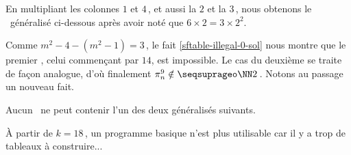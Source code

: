 En multipliant les colonnes $1$ et $4$\,, et aussi la $2$ et la $3$\,, nous obtenons le \sftab\ généralisé ci-dessous après avoir noté que $6 \times 2 = 3 \times 2^2$.

\begin{center}
\end{center}


Comme $m^2 - 4 - ( m^2 - 1 ) = 3$\,, le fait \ref{sftable-illegal-0-sol} nous montre que le premier \sftab[], celui commençant par $14$, est impossible.
Le cas du deuxième se traite de façon analogue, d'où finalement $\consprod<9> \notin \NNsquare$\,. Notons au passage un nouveau fait.


\begin{fact} \label{no-sftab-1.6.*.2.3}
	Aucun \sftab\ ne peut contenir l'un des deux \sftab[x] généralisés suivants.
	\begin{center}
	\end{center} 
\end{fact}




À partir de $k = 18$\,, un programme basique n'est plus utilisable car il y a trop de tableaux à construire...
